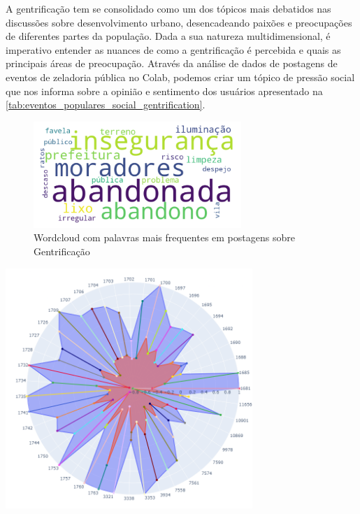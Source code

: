 A gentrificação tem se consolidado como um dos tópicos mais debatidos nas discussões sobre desenvolvimento urbano, desencadeando paixões e preocupações de diferentes partes da população. Dada a sua natureza multidimensional, é imperativo entender as nuances de como a gentrificação é percebida e quais as principais áreas de preocupação. Através da análise de dados de postagens de eventos de zeladoria pública no Colab, podemos criar um tópico de pressão social que nos informa sobre a opinião e sentimento dos usuários apresentado na \autoref{tab:eventos_populares_social_gentrification}.

\begin{figure}[htb]
	\centering
	\includegraphics[width=0.7\textwidth]{images/wordcloud_gentrification.png}
	\caption{Wordcloud com palavras mais frequentes em postagens sobre Gentrificação}
	\label{fig:wordcloud_gentrification}
\end{figure}

\begin{quadro}[htb]
	\centering
	\includegraphics[width=0.7\textwidth]{images/social_barometer_gentrification.png}
	\caption{Gráfico de Radar ilustrando a pressão social em relação ao tópico de Gentrificação}
	\label{fig:social_barometer_gentrification}
\end{quadro}

